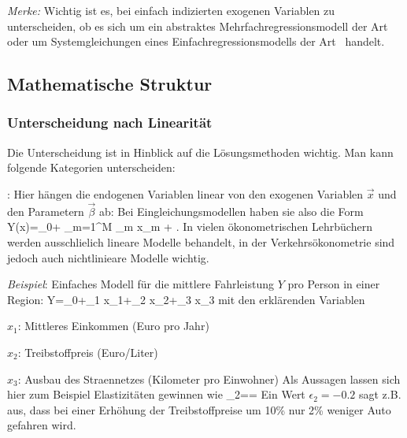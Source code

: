 \noindent
\emph{Merke:} Wichtig ist es, bei einfach indizierten exogenen Variablen zu
unterscheiden, ob es sich um ein abstraktes Mehrfachregressionsmodell
der Art~ oder um Systemgleichungen eines
Einfachregressionsmodells der Art~ handelt.





\subsection{Mathematische Struktur}

\subsubsection{\label{sec:quasilin}Unterscheidung nach Linearit\"at}

Die Unterscheidung ist in Hinblick auf die L\"osungsmethoden
wichtig. Man kann folgende Kategorien unterscheiden:
\bi
\item {}: Hier h\"angen die endogenen Variablen
linear von den exogenen Variablen $\vec{x}$ und den Parametern
$\vec{\beta}$ ab: Bei Eingleichungsmodellen haben sie
also die
Form
\be
\label{linMultiAllg}
Y(x)=\beta_0+ \sum\limits_{m=1}^M \beta_m x_m  + \epsilon .
\ee
In vielen \"okonometrischen Lehrb\"uchern werden ausschlie\3lich
lineare Modelle behandelt, in der Verkehrs\"okonometrie sind jedoch
auch nichtlinieare Modelle wichtig.

\textit{Beispiel}: Einfaches Modell f\"ur die mittlere
Fahrleistung $Y$ pro Person in einer Region:
\be
\label{linExample}
Y=\beta_0+\beta_1 x_1+\beta_2 x_2+\beta_3 x_3
\ee
mit den erkl\"arenden Variablen
\bi
\item $x_1$: Mittleres Einkommen (Euro pro Jahr)
\item $x_2$: Treibstoffpreis (Euro/Liter)
\item $x_3$: Ausbau des Stra\3ennetzes (Kilometer pro Einwohner)
\ei
Als Aussagen lassen sich hier zum Beispiel Elastizit\"aten gewinnen
wie
\bdm
\epsilon_2==
\edm
Ein Wert $\epsilon_2=-0.2$ sagt z.B. aus, dass bei einer Erh\"ohung
der Treibstoffpreise um 10\% nur 2\% weniger Auto gefahren wird.

